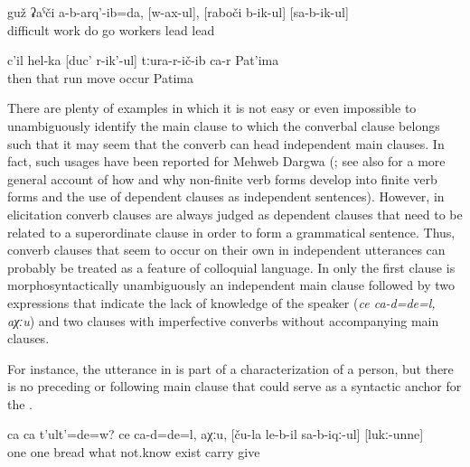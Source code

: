 \begin{enumerate}
\begin{exe}
		\ex	\label{ex:I did not do a difficult work, driving, bringing the workers (to the wine factory) and bringing them back}
		\gll	guž	ʡaˁči	a-b-arq'-ib=da,	[w-ax-ul],	[raboči	b-ik-ul]	[sa-b-ik-ul]\\
			difficult	work	do	go workers	lead	lead\\
		\glt	{}
	
		\ex	\label{ex:Then Patima appeared outside running}
		\gll	c'il	hel-ka	[duc'	r-ik'-ul]	tːura-r-ič-ib	ca-r	Pat'ima\\
			then	that	run	move	occur		Patima\\
		\glt	{}
	\end{exe}
	
There are plenty of examples in which it is not easy or even impossible to unambiguously identify the main clause to which the converbal clause belongs such that it may seem that the converb can head independent main clauses. In fact, such usages have been reported for Mehweb Dargwa (\citet{Kustova2015}; see also \citet{Mithun2008} for a more general account of how and why non-finite verb forms develop into finite verb forms and the use of dependent clauses as independent sentences). However, in elicitation converb clauses are always judged as dependent clauses that need to be related to a superordinate clause in order to form a grammatical sentence. Thus, converb clauses that seem to occur on their own in independent utterances can probably be treated as a feature of colloquial language. In  only the first clause is morphosyntactically unambiguously an independent main clause followed by two expressions that indicate the lack of knowledge of the speaker (\textit{ce ca-d=de=l, aχːu}) and two clauses with imperfective converbs without accompanying main clauses.

For instance, the utterance in  is part of a characterization of a person, but there is no preceding or following main clause that could serve as a syntactic anchor for the .
	\begin{exe}
		\ex	\label{ex:‎There was bread one for everyone, whatever}
		\gll	ca	ca	t'ult'=de=w?	ce	ca-d=de=l,	aχːu,	[ču-la	le-b-il	sa-b-iqː-ul]	[lukː-unne]\\
			one	one	bread	what		not.know		exist	carry\tsc{.ipfv-icvb}	give\\
		\glt	{}
	

\end{exe}
\end{enumerate}

